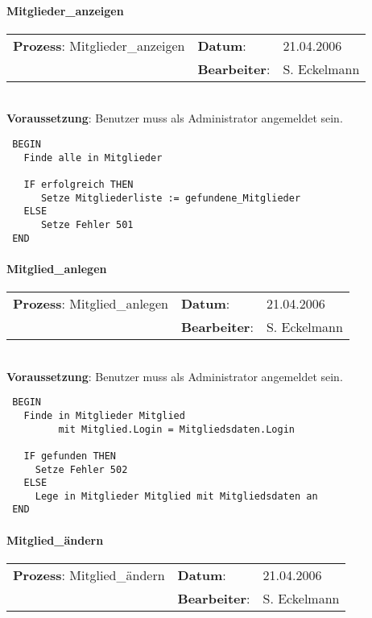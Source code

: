 \paragraph{Mitglieder\_anzeigen}
\begin{tabular}[t]{p{9.5cm}ll}
\textbf{Prozess}: Mitglieder\_anzeigen 	&\textbf{Datum}:      &21.04.2006\\
					&\textbf{Bearbeiter}: &S. Eckelmann\\
\end{tabular}

\hrulefill\\
\textbf{Voraussetzung}: Benutzer muss als Administrator angemeldet sein.
\begin{verbatim}
 BEGIN
   Finde alle in Mitglieder

   IF erfolgreich THEN
      Setze Mitgliederliste := gefundene_Mitglieder
   ELSE
      Setze Fehler 501
 END
\end{verbatim}
\hrulefill

\paragraph{Mitglied\_anlegen}
\begin{tabular}[t]{p{9.5cm}ll}
\textbf{Prozess}: Mitglied\_anlegen  	&\textbf{Datum}:      &21.04.2006\\
					&\textbf{Bearbeiter}: &S. Eckelmann\\
\end{tabular}

\hrulefill\\
\textbf{Voraussetzung}: Benutzer muss als Administrator angemeldet sein.
\begin{verbatim}
 BEGIN
   Finde in Mitglieder Mitglied
         mit Mitglied.Login = Mitgliedsdaten.Login

   IF gefunden THEN
     Setze Fehler 502
   ELSE
     Lege in Mitglieder Mitglied mit Mitgliedsdaten an
 END
\end{verbatim}
\hrulefill



\paragraph{Mitglied\_ändern}
\begin{tabular}[t]{p{9.5cm}ll}
\textbf{Prozess}: Mitglied\_ändern  	&\textbf{Datum}:      &21.04.2006\\
					&\textbf{Bearbeiter}: &S. Eckelmann\\
\end{tabular}

